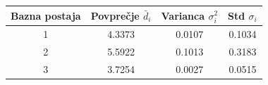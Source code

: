 \begin{tabular}{|c|c|c|c|}\hline
Bazna postaja & Povpre\v{c}je $\bar{d}_i$ & Varianca $\sigma_i^2$ & Std $\sigma_i$ \\\hline
1 & 4.3373 & 0.0107 & 0.1034 \\
2 & 5.5922 & 0.1013 & 0.3183 \\
3 & 3.7254 & 0.0027 & 0.0515 \\
\hline\end{tabular}
